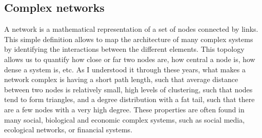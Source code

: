 \subsection{\label{subsec:Complex networks} Complex networks}
A network is a mathematical representation of a set of nodes connected by links. This simple definition allows to map the architecture of many complex systems by identifying the interactions between the different elements. This topology allows us to quantify how close or far two nodes are, how central a node is, how dense a system is, etc. As I understood it through these years, what makes a network complex is having a short path length, such that average distance between two nodes is relatively small, high levels of clustering, such that nodes tend to form triangles, and a degree distribution with a fat tail, such that there are a few nodes with a very high degree. These properties are often found in many social, biological and economic complex systems, such as social media, ecological networks, or financial systems.


